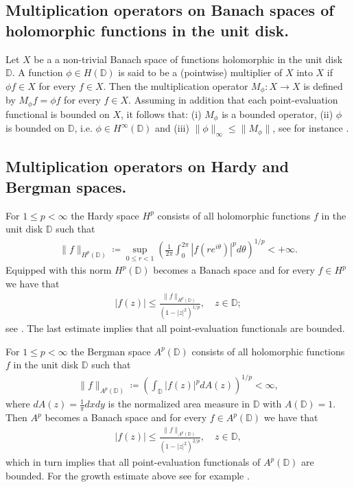 \documentclass[12pt,leqno]{amsart}
\theoremstyle{plain}
\theoremstyle{definition}
\numberwithin{equation}{section}
\begin{document}
\subsection{Multiplication operators on Banach spaces of holomorphic functions in the unit disk.}

Let $X$ be a a non-trivial Banach space of functions holomorphic in the unit disk $\mathbb D$. A function $\phi\in H(\mathbb D)$ is said to be a (pointwise) multiplier of $X$ into $X$ if $\phi f\in X$ for every $f\in X$. Then the multiplication operator $M_{\phi }:X\to X$ is defined by $M_{\phi }f=\phi f$ for every $f\in X$. Assuming in addition that each point-evaluation functional is bounded on $X$, it follows that: (i) $M_{\phi }$ is a bounded operator, (ii) $\phi $ is bounded on $\mathbb D$, i.e. $\phi \in H^{\infty}(\mathbb D)$ and (iii) $\| \phi \|_{\infty}\leq \| M_{\phi } \| $, see for instance \cite{ADMV}.

\subsection{Multiplication operators on Hardy and Bergman spaces.}

For $1\leq p<\infty $ the Hardy space $H^p$ consists of all holomorphic functions $f$ in the unit disk $\mathbb D$ such that 
\begin{align*}
	\| f\|_{H^p(\mathbb D)}\coloneqq \sup_{0\leq r<1}{\left( \frac{1}{2\pi }\int_0^{2\pi }|f(re^{i\theta })|^pd\theta \right) }^{1/p}<+\infty . 
\end{align*}
Equipped with this norm $H^p(\mathbb D)$ becomes a Banach space and for every $f\in H^p$ we have that 
\begin{align}
	\label{e.growthHp} |f(z)|\leq \frac{\| f\|_{H^p(\mathbb D)}}{(1-|z|^2)^{1/p}}, \quad z\in \mathbb D;
\end{align}
see \cite{Duren}. The last estimate implies that all point-evaluation functionals are bounded.

For $1\leq p<\infty $ the Bergman space $A^p(\mathbb D)$ consists of all holomorphic functions $f$ in the unit disk $\mathbb D$ such that 
\begin{align*}
	\| f\|_{A^p(\mathbb D)}\coloneqq \left( \int_{\mathbb D}|f(z)|^pdA(z) \right)^{1/p} <\infty , 
\end{align*}
where $dA(z)=\frac{1}{\pi}dxdy$ is the normalized area measure in $\mathbb D$ with $A(\mathbb D)=1$. Then $A^p$ becomes a Banach space and for every $f\in A^p(\mathbb D)$ we have that 
\begin{align}\label{e.growthAp}
	|f(z)|\leq \frac{\| f\|_{A^p (\mathbb D)}}{(1-|z|^2)^{2/p}}, \quad z\in \mathbb D , 
\end{align}
which in turn implies that all point-evaluation functionals of $A^p(\mathbb D)$ are bounded. For the growth estimate above see for example \cite{ADMV}.
\end{document}
